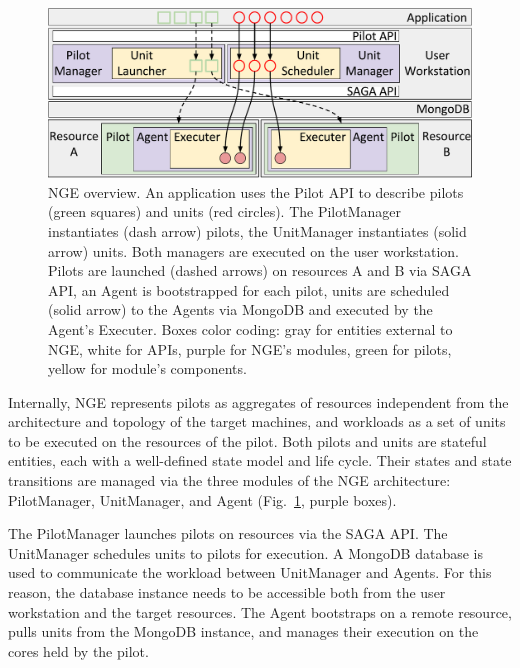 \begin{figure}
  \centering
   \includegraphics[width=\columnwidth]{figures/architecture_compact_rp_paper.pdf}
  \caption{NGE overview. An application uses the Pilot API to describe pilots
    (green squares) and units (red circles). The PilotManager instantiates
    (dash arrow) pilots, the UnitManager instantiates (solid arrow) units.
    Both managers are executed on the user workstation. Pilots are launched
    (dashed arrows) on resources A and B via SAGA API, an Agent is
    bootstrapped for each pilot, units are scheduled (solid arrow) to the
    Agents via MongoDB and executed by the Agent's Executer. Boxes color
    coding: gray for entities external to NGE, white for APIs, purple for NGE's
    modules, green for pilots, yellow for module's components.
\label{fig:arch-overview}
  }
\end{figure}

Internally, NGE represents pilots as aggregates of resources independent from
the architecture and topology of the target machines, and workloads as a set
of units to be executed on the resources of the pilot. Both pilots and units
are stateful entities, each with a well-defined state model and life cycle.
Their states and state transitions are managed via the three modules of the NGE
architecture: PilotManager, UnitManager, and Agent
(Fig.~\ref{fig:arch-overview}, purple boxes).

The PilotManager launches pilots on resources via the SAGA API\@\cite{radical-saga_url}.
The UnitManager schedules units to pilots for execution. A MongoDB database is used to communicate the workload between UnitManager and Agents.  For this reason, the database instance needs to be
accessible both from the user workstation and the target resources. The Agent
bootstraps on a remote resource, pulls units from the MongoDB instance, and
manages their execution on the cores held by the pilot.

